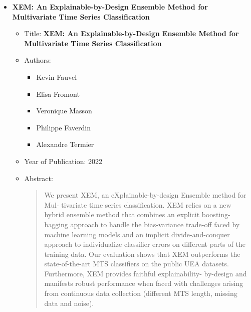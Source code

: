 \documentclass{article}
\begin{document}
\begin{itemize}
        \item \textbf{XEM: An Explainable-by-Design Ensemble Method
        for Multivariate Time Series Classification}
        \begin{itemize}
            \item Title: \textbf{XEM: An Explainable-by-Design Ensemble Method
            for Multivariate Time Series Classification}
            \item Authors:
            \begin{itemize}
                \item Kevin Fauvel
                \item Elisa Fromont
                \item Veronique Masson
                \item Philippe Faverdin
                \item Alexandre Termier
            \end{itemize}
            \item Year of Publication: 2022
            \item Abstract:
            \begin{abstract}
                We present XEM, an eXplainable-by-design Ensemble method for Mul-
                tivariate time series classification. XEM relies on a new hybrid ensemble method
                that combines an explicit boosting-bagging approach to handle the bias-variance
                trade-off faced by machine learning models and an implicit divide-and-conquer
                approach to individualize classifier errors on different parts of the training data.
                Our evaluation shows that XEM outperforms the state-of-the-art MTS classifiers
                on the public UEA datasets. Furthermore, XEM provides faithful explainability-
                by-design and manifests robust performance when faced with challenges arising
                from continuous data collection (different MTS length, missing data and noise).
            \end{abstract}
        \end{itemize}
        

\end{itemize}
\end{document}
